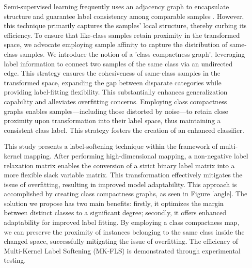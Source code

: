 Semi-supervised learning frequently uses an adjacency graph to encapsulate structure and guarantee label consistency among comparable samples \cite{nie2013adaptive,belkin2006manifold}. However, this technique primarily captures the samples' local structure, thereby curbing its efficiency. To ensure that like-class samples retain proximity in the transformed space, we advocate employing sample affinity to capture the distribution of same-class samples. We introduce the notion of a 'class compactness graph', leveraging label information to connect two samples of the same class via an undirected edge. This strategy ensures the cohesiveness of same-class samples in the transformed space, expanding the gap between disparate categories while providing label-fitting flexibility. This substantially enhances generalization capability and alleviates overfitting concerns. Employing class compactness graphs enables samples—including those distorted by noise—to retain close proximity upon transformation into their label space, thus maintaining a consistent class label. This strategy fosters the creation of an enhanced classifier.

 

This study presents a label-softening technique within the framework of multi-kernel mapping. After performing high-dimensional mapping, a non-negative label relaxation matrix enables the conversion of a strict binary label matrix into a more flexible slack variable matrix. This transformation effectively mitigates the issue of overfitting, resulting in improved model adaptability. This approach is accomplished by creating class compactness graphs, as seen in Figure \ref{angle}. The solution we propose has two main benefits: firstly, it optimizes the margin between distinct classes to a significant degree; secondly, it offers enhanced adaptability for improved label fitting. By employing a class compactness map, we can preserve the proximity of instances belonging to the same class inside the changed space, successfully mitigating the issue of overfitting. The efficiency of Multi-Kernel Label Softening (MK-FLS) is demonstrated through experimental testing.

